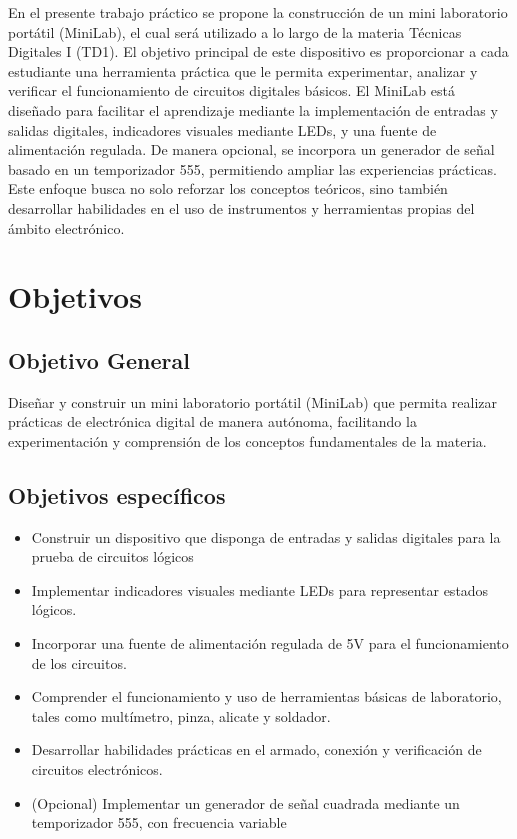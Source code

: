 \documentclass[12pt,a4paper]{article}
\begin{document}

En el presente trabajo práctico se propone la construcción de un mini laboratorio
portátil (MiniLab), el cual será utilizado a lo largo de la materia Técnicas Digitales I
(TD1).
El objetivo principal de este dispositivo es proporcionar a cada estudiante una herramienta
práctica que le permita experimentar, analizar y verificar el funcionamiento de
circuitos digitales básicos.
El MiniLab está diseñado para facilitar el aprendizaje mediante la implementación
de entradas y salidas digitales, indicadores visuales mediante LEDs, y una fuente de
alimentación regulada. De manera opcional, se incorpora un generador de señal basado
en un temporizador 555, permitiendo ampliar las experiencias prácticas.
Este enfoque busca no solo reforzar los conceptos teóricos, sino también desarrollar
habilidades en el uso de instrumentos y herramientas propias del ámbito electrónico.

\vspace{0.5cm}

\section{Objetivos}

\subsection{Objetivo General}
Diseñar y construir un mini laboratorio portátil (MiniLab) que permita realizar prácticas de electrónica digital de
manera autónoma, facilitando la experimentación y comprensión de los conceptos fundamentales de la materia.

\subsection{Objetivos específicos}

\begin{itemize}
    \item Construir un dispositivo que disponga de entradas y salidas digitales para la prueba
        de circuitos lógicos
    \item Implementar indicadores visuales mediante LEDs para representar estados lógicos.
    \item Incorporar una fuente de alimentación regulada de 5V para el funcionamiento de
        los circuitos.
    \item Comprender el funcionamiento y uso de herramientas básicas de laboratorio, tales
        como multímetro, pinza, alicate y soldador.
    \item Desarrollar habilidades prácticas en el armado, conexión y verificación de circuitos
        electrónicos.
    \item (Opcional) Implementar un generador de señal cuadrada mediante un temporizador
        555, con frecuencia variable
\end{itemize}   
\end{document}
